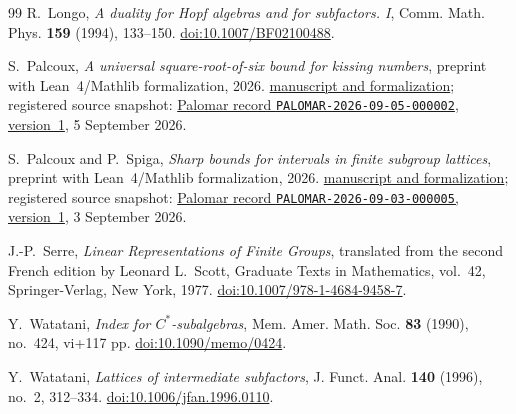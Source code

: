 \documentclass[11pt]{amsart}
\theoremstyle{definition}
\theoremstyle{remark}
\begin{document}
\begin{thebibliography}{99}
R.~Longo,
\emph{A duality for Hopf algebras and for subfactors. I},
Comm. Math. Phys. \textbf{159} (1994), 133--150.
\href{https://doi.org/10.1007/BF02100488}{doi:10.1007/BF02100488}.

S.~Palcoux,
\emph{A universal square-root-of-six bound for kissing numbers},
preprint with Lean~4/Mathlib formalization, 2026.
\href{https://github.com/sebastienpalcoux/sqrt6-kissing-bound}
{manuscript and formalization}; registered source snapshot:
\href{https://palomar-registry.org/entry.html?id=PALOMAR-2026-09-05-000002\&version=1}
{Palomar record \texttt{PALOMAR-2026-09-05-000002}, version~1},
5 September 2026.

S.~Palcoux and P.~Spiga,
\emph{Sharp bounds for intervals in finite subgroup lattices},
preprint with Lean~4/Mathlib formalization, 2026.
\href{https://github.com/sebastienpalcoux/sharp-intermediate-subgroup-bounds}
{manuscript and formalization}; registered source snapshot:
\href{https://palomar-registry.org/entry.html?id=PALOMAR-2026-09-03-000005\&version=1}
{Palomar record \texttt{PALOMAR-2026-09-03-000005}, version~1},
3 September 2026.

J.-P.~Serre,
\emph{Linear Representations of Finite Groups},
translated from the second French edition by Leonard L.~Scott,
Graduate Texts in Mathematics, vol.~42,
Springer-Verlag, New York, 1977.
\href{https://doi.org/10.1007/978-1-4684-9458-7}
{doi:10.1007/978-1-4684-9458-7}.

Y.~Watatani,
\emph{Index for $C^*$-subalgebras},
Mem. Amer. Math. Soc. \textbf{83} (1990), no.~424, vi+117 pp.
\href{https://doi.org/10.1090/memo/0424}{doi:10.1090/memo/0424}.

Y.~Watatani,
\emph{Lattices of intermediate subfactors},
J. Funct. Anal. \textbf{140} (1996), no.~2, 312--334.
\href{https://doi.org/10.1006/jfan.1996.0110}
{doi:10.1006/jfan.1996.0110}.

\end{thebibliography}
\end{document}
